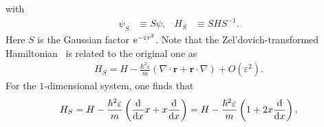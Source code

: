 with
\begin{align}
    \psi_S &\equiv S\psi,& H_S &\equiv S H S^{-1}.
\end{align}
Here $S$ is the Gaussian factor $\mathrm{e}^{-\varepsilon r^2}$.
Note that the Zel'dovich-transformed Hamiltonian~\cite{Moiseyev:2011} is related to the original one as
\begin{align}
    H_S = H - \frac{\hbar^2\varepsilon}{m}(\nabla \cdot \bm{r} + \bm{r} \cdot \nabla)
    + O(\varepsilon^2) .
\end{align}
For the $1$-dimensional system, one finds that
\begin{align}
    H_S = H - \frac{\hbar^2\varepsilon}{m} \left(\frac{\mathrm{d}}{\mathrm{d} x}x+x\frac{\mathrm{d}}{\mathrm{d} x}\right)
        = H - \frac{\hbar^2\varepsilon}{m} \left(1 + 2 x \frac{\mathrm{d}}{\mathrm{d} x}\right).
    \label{src:2505_02301:eq:zel_hamiltonian}
\end{align}

